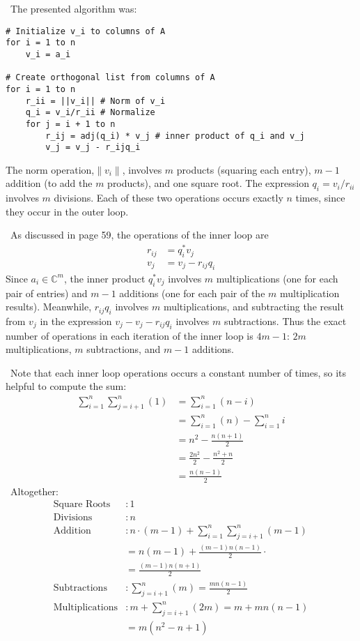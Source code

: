 \documentclass[12pt]{article}
\newenvironment{sol}[1][Solution]{\begin{trivlist}
		\item[\hskip \labelsep {\bfseries #1:}]}{\end{trivlist}}
\begin{document}
\begin{sol}
	\
	The presented algorithm was:
	\begin{lstlisting}[language={}]
# Initialize v_i to columns of A
for i = 1 to n
	v_i = a_i

# Create orthogonal list from columns of A
for i = 1 to n
	r_ii = ||v_i|| # Norm of v_i
	q_i = v_i/r_ii # Normalize
	for j = i + 1 to n
		r_ij = adj(q_i) * v_j # inner product of q_i and v_j
		v_j = v_j - r_ijq_i

	\end{lstlisting}
	The norm operation,$\lVert v_i\rVert$, involves $m$ products (squaring each entry), $m-1$ addition (to add
	the $m$ products), and one square root. The expression $q_i=v_i/r_{ii}$ involves $m$ divisions.
	Each of these two operations occurs exactly $n$ times, since they occur in the outer loop.
	
	\
	As discussed in page 59, the operations of the inner loop are
	\begin{align*}
	r_{ij} &= q_i^*v_j\\
	v_j &= v_j - r_{ij}q_i
	\end{align*}
	Since $a_i\in\mathbb{C}^{m}$, the inner product $q_i^*v_j$ involves $m$ multiplications (one for
	each pair of entries) and $m-1$ additions (one for each pair of the $m$ multiplication results).
	Meanwhile, $r_{ij}q_i$ involves $m$ multiplications, and subtracting the result from $v_j$ in the
	expression $v_j-v_j-r_{ij}q_i$ involves $m$ subtractions. Thus the exact number of operations in
	each iteration of the inner loop is $4m-1$: $2m$ multiplications, $m$ subtractions, and $m-1$ additions.
	
	\
	Note that each inner loop operations occurs a constant number of times, so its helpful to compute the
	sum:
	\begin{align*}
	\sum_{i=1}^{n}\sum_{j=i+1}^{n}(1)&=\sum_{i=1}^{n}(n-i)\\
	&=\sum_{i=1}^{n}(n)-\sum_{i=1}^{n}i\\
	&=n^2 - \frac{n(n+1)}{2}\\
	&=\frac{2n^2}{2}-\frac{n^2+n}{2}\\
	&=\frac{n(n-1)}{2}
	\end{align*}
	\
	Altogether:
	\begin{align*}
		\text{Square Roots} &: 1\\
		\text{Divisions} &: n\\
		\text{Addition} &: n\cdot (m-1) + \sum_{i=1}^{n}\sum_{j=i+1}^{n}(m-1)\\
		&=n(m-1)+\frac{(m-1)n(n-1)}{2}\cdot\\
		&=\frac{(m-1)n(n+1)}{2}\\
		\text{Subtractions} &: \sum_{j=i+1}^{n}(m)=\frac{mn(n-1)}{2}\\
		\text{Multiplications} &: m + \sum_{j=i+1}^{n}(2m)=m+mn(n-1)\\
		&=m(n^2-n+1)
	\end{align*}
\end{sol}
\end{document}
